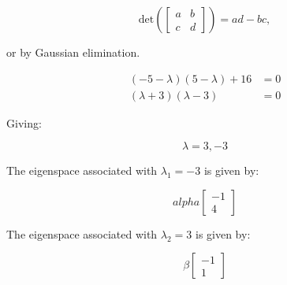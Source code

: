 \begin{enumerate}
{\[\text{det}\left( \begin{bmatrix}a & b \\ c & d\end{bmatrix} \right) = ad - bc,\]

or by Gaussian elimination.

\begin{align*}
(-5-\lambda)(5-\lambda) + 16 &=0 \\
(\lambda + 3)(\lambda -3) &= 0	
\end{align*}

Giving:

\[\lambda = 3, -3\]

The eigenspace associated with $\lambda_1 = -3$ is given by:

	\[ alpha \begin{bmatrix} -1 \\ 4\end{bmatrix} \]

The eigenspace associated with $\lambda_2 = 3$ is given by:
	
	\[\beta \begin{bmatrix} -1 \\ 1\end{bmatrix} \]

}
\end{enumerate}
